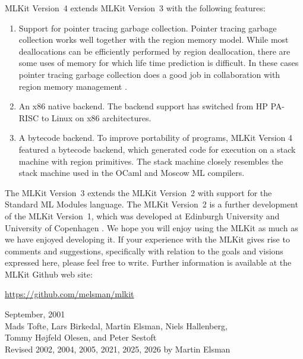 \documentclass[12pt]{book}
\begin{document}
MLKit Version~4 extends MLKit Version~3 with the following features:
\begin{enumerate}
\item Support for pointer tracing garbage collection. Pointer tracing garbage
  collection works well together with the region memory model.  While most
  deallocations can be efficiently performed by region deallocation, there are
  some uses of memory for which life time prediction is difficult. In these
  cases pointer tracing garbage collection does a good job in collaboration with
  region memory management \cite{hallenberg99,het02}.
\item An x86 native backend. The
  backend support has switched from HP PA-RISC to Linux on x86 architectures.

\item A
  bytecode backend. To improve portability of programs, MLKit Version 4 featured
  a bytecode backend, which generated code for execution on a stack machine with
  region primitives. The stack machine closely resembles the stack machine used
  in the OCaml and Moscow ML compilers.
\end{enumerate}

The
%
%
%
MLKit Version~3 extends the MLKit Version~2 with support for the Standard ML
Modules language. The
%
%
%
MLKit Version~2 is a further development of the
%
%
%
MLKit Version~1, which was developed at Edinburgh University and University of
Copenhagen \cite{brtt93}.  We hope you will enjoy using the MLKit as much as we
have enjoyed developing it. If your experience with the MLKit gives rise to
comments and suggestions, specifically with relation to the goals and visions
expressed here, please feel free to write.  Further information is available at
the MLKit
%
%
%
Github web site:
\begin{tabbing}
\hskip2cm\url{https://github.com/melsman/mlkit}
\end{tabbing}

\begin{flushright}
September, 2001\\[5mm]
Mads Tofte, Lars Birkedal, Martin Elsman, Niels Hallenberg, \\
Tommy H\o jfeld Olesen, and Peter Sestoft \\[5mm]
Revised 2002, 2004, 2005, 2021, 2025, 2026 by Martin Elsman
\end{flushright}
\end{document}
